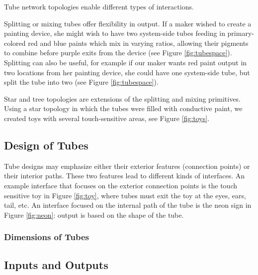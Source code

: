 Tube network topologies enable different types of interactions.

Splitting or mixing tubes offer flexibility in output.  If a maker wished to create a painting device, she might wish to have two system-side tubes feeding in primary-colored red and blue paints which mix in varying ratios, allowing their pigments to combine before purple exits from the device (see Figure \ref{fig:tubespace}).  Splitting can also be useful, for example if our maker wants red paint output in two locations from her painting device, she could have one system-side tube, but split the tube into two (see Figure \ref{fig:tubespace}). 

Star and tree topologies are extensions of the splitting and mixing primitives.  Using a star topology in which the tubes were filled with conductive paint, we created toys with several touch-sensitive areas, see Figure \ref{fig:toys}. 

\subsection{Design of Tubes}

Tube designs may emphasize either their exterior features (connection points) or their interior paths.  These two features lead to different kinds of interfaces.  An example interface that focuses on the exterior connection points is the touch sensitive toy in Figure \ref{fig:toy}, where tubes must exit the toy at the eyes, ears, tail, etc.  An interface focused on the internal path of the tube is the neon sign in Figure \ref{fig:neon}: output is based on the shape of the tube.

\subsubsection{Dimensions of Tubes}


\subsection{Inputs and Outputs}

